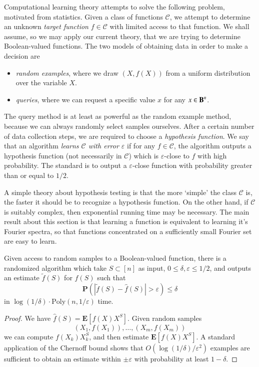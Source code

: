 Computational learning theory attempts to solve the following problem, motivated from statistics. Given a class of functions $\mathcal{C}$, we attempt to determine an unknown \emph{target function} $f \in \mathcal{C}$ with limited access to that function. We shall assume, so we may apply our current theory, that we are trying to determine Boolean-valued functions. The two models of obtaining data in order to make a decision are
%
\begin{itemize}
    \item \emph{random examples}, where we draw $(X,f(X))$ from a uniform distribution over the variable $X$.
    \item \emph{queries}, where we can request a specific value $x$ for any $x \in \operatorname{\mathbf{B}}^n$.
\end{itemize}
%
The query method is at least as powerful as the random example method, because we can always randomly select samples ourselves. After a certain number of data collection steps, we are required to choose a \emph{hypothesis function}. We say that an algorithm \emph{learns $\mathcal{C}$ with error $\varepsilon$} if for any $f \in \mathcal{C}$, the algorithm outputs a hypothesis function (not necessarily in $\mathcal{C}$) which is $\varepsilon$-close to $f$ with high probability. The standard is to output a $\varepsilon$-close function with probability greater than or equal to $1/2$.

A simple theory about hypothesis testing is that the more `simple' the class $\mathcal{C}$ is, the faster it should be to recognize a hypothesis function. On the other hand, if $\mathcal{C}$ is suitably complex, then exponential running time may be necessary. The main result about this section is that learning a function is equivalent to learning it's Fourier spectra, so that functions concentrated on a sufficiently small Fourier set are easy to learn.

\begin{theorem}
    Given access to random samples to a Boolean-valued function, there is a randomized algorithm which take $S \subset [n]$ as input, $0 \leq \delta, \varepsilon \leq 1/2$, and outputs an estimate $\widetilde{f}(S)$ for $\widehat{f}(S)$ such that
    \[ \mathbf{P}(|\widetilde{f}(S) - \widehat{f}(S)| > \varepsilon) \leq \delta \]
    in $\log(1/\delta) \cdot \text{Poly}(n, 1/\varepsilon)$ time.
\end{theorem}
\begin{proof}
    We have $\widehat{f}(S) = \mathbf{E}[f(X) X^S]$. Given random samples
    \[ (X_1, f(X_1)), \dots, (X_m, f(X_m)) \]
    we can compute $f(X_k)X_k^S$, and then estimate $\mathbf{E}[f(X) X^S]$. A standard application of the Chernoff bound shows that $O(\log(1/\delta)/\varepsilon^2)$ examples are sufficient to obtain an estimate within $\pm \varepsilon$ with probability at least $1 - \delta$.
\end{proof}

